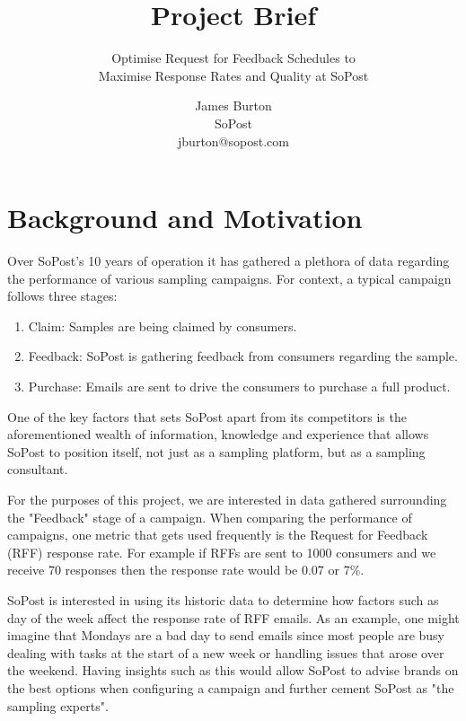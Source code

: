 \documentclass[12pt]{scrartcl}
\begin{document}


\title{Project Brief}
\subtitle{Optimise Request for Feedback Schedules to\\
Maximise Response Rates and Quality at SoPost}
\author{James Burton\\SoPost\\jburton@sopost.com}
\maketitle

\section{Background and Motivation}

Over SoPost's 10 years of operation it has gathered a plethora of data regarding
the performance of various sampling campaigns. For context, a typical campaign
follows three stages:

\begin{enumerate}
    \item Claim: Samples are being claimed by consumers.
    \item Feedback: SoPost is gathering feedback from consumers regarding the sample.
    \item Purchase: Emails are sent to drive the consumers to purchase a full product.
\end{enumerate}

One of the key factors that sets SoPost apart from its competitors is the
aforementioned wealth of information, knowledge and experience that allows
SoPost to position itself, not just as a sampling platform, but as a sampling
consultant.

For the purposes of this project, we are interested in data gathered surrounding
the "Feedback" stage of a campaign. When comparing the performance of campaigns,
one metric that gets used frequently is the Request for Feedback (RFF) response rate.
For example if RFFs are sent to 1000 consumers and we receive 70 responses then the
response rate would be 0.07 or 7\%.

SoPost is interested in using its historic data to determine how factors such
as day of the week affect the response rate of RFF emails. As an example, one
might imagine that Mondays are a bad day to send emails since most people are
busy dealing with tasks at the start of a new week or handling issues that arose
over the weekend. Having insights such as this would allow SoPost to advise brands
on the best options when configuring a campaign and further cement SoPost as "the
sampling experts".
\end{document}
